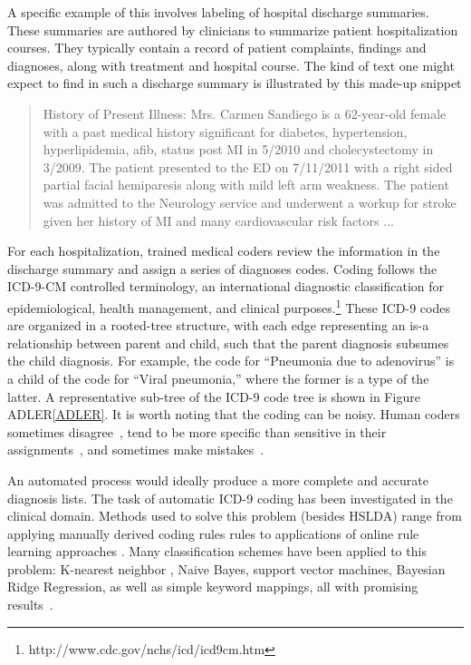 A specific example of this involves labeling of hospital discharge summaries.  These summaries are authored by clinicians to summarize patient
hospitalization courses. They typically contain a record of patient
complaints, findings and diagnoses, along with treatment and hospital course.  The kind of text one might expect to find in such a discharge summary is illustrated by this made-up snippet
\begin{quote}
{History of Present Illness: Mrs. Carmen Sandiego is a 62-year-old female with a past medical history significant for diabetes, hypertension, hyperlipidemia, afib, status post MI in 5/2010 and cholecystectomy in 3/2009.  The patient presented to the ED on 7/11/2011 with a right sided partial facial hemiparesis along with mild left arm weakness.  The patient was admitted to the Neurology service and underwent a workup for stroke given her history of MI and many cardiovascular risk factors ...}
\end{quote} 
For each hospitalization, trained medical coders review the information in the
discharge summary and assign a series of diagnoses codes. Coding follows the
ICD-9-CM controlled terminology, an international diagnostic classification for
epidemiological, health management, and clinical
purposes.\footnote{http://www.cdc.gov/nchs/icd/icd9cm.htm}  These ICD-9 codes are organized in a rooted-tree structure, with each
edge representing an is-a relationship between parent and child, such that the
parent diagnosis subsumes the child diagnosis. For example, the code for
{}``Pneumonia due to adenovirus'' is a child of the code for {}``Viral
pneumonia,'' where the former is a type of the latter.  A representative sub-tree of the ICD-9 code tree is shown in Figure ADLER\ref{ADLER}. It is worth noting that
the coding can be noisy. Human coders sometimes disagree~\cite{Challenge07},
tend to be more specific than sensitive in their
assignments~\cite{Birmetal2005}, and sometimes make
mistakes~\cite{FarzandipourEtAl10}.

An automated process would ideally produce a more complete and accurate
diagnosis lists. %
The task of automatic ICD-9 coding has been investigated in the clinical
domain.  Methods used to solve this problem (besides HSLDA) range from applying manually derived coding rules
rules to applications of online rule learning approaches \cite{Crammer2007,Goldstein2007,Farkas2008}.
Many classification schemes have been applied to this problem: K-nearest
neighbor , Naive Bayes, support vector machines, Bayesian Ridge Regression, as
well as simple keyword mappings, all with promising
results~\cite{LarkeyCroft95,RibeiroNeto2001,PakhomovEtAl06,Lita2008}.%

